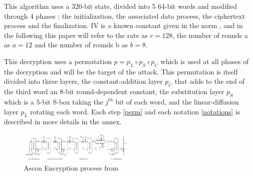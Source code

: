 \documentclass[a4paper,11pt,twocolumn]{article}
\begin{document}
		\begin{algorithm}[h]
		\end{algorithm}
		
		This algorithm uses a 320-bit state, divided into 5 64-bit words and modified through 4 phases : the initialization, the associated data process, the ciphertext process and the finalization. IV is a known constant given in the norm \cite{norme}, and in the following this paper will refer to the rate as $r=128$, the number of rounds a as $a=12$ and the number of rounds b as $b=8$.
		
				
		This decryption uses a permutation $p = p_L \circ p_S \circ p_C$ which is used at all phases of the decryption and will be the target of the attack. This permutation is itself divided into three layers, the constant-addition layer $p_C$ that adds to the end of the third word an 8-bit round-dependent constant, the substitution layer $p_S$ which is a 5-bit S-box taking the $j^{th}$ bit of each word, and the linear-diffusion layer $p_L$ rotating each word. Each step \ref{perm} and each notation \ref{notations} is described in more details in the annex.
		
		\begin{figure}[h]
			\centering
			\includegraphics[width=0.5\textwidth]{encryption}
			\caption{Ascon Encryption process from \cite{norme}}
			\label{fig:enc}
		\end{figure}
		
\end{document}
